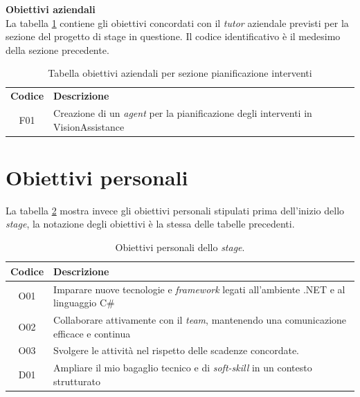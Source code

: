 \textbf{Obiettivi aziendali}\\
La tabella \ref{tab:obiettivi-aziendali-interventi} contiene gli obiettivi concordati con il \textit{tutor} aziendale previsti per la sezione del progetto di stage in questione.
Il codice identificativo è il medesimo della sezione precedente.
\begin{table}[H]
\centering
\begin{tabular}{|c|p{11cm}|}
\hline
\textbf{Codice} & \textbf{Descrizione} \\
F01 &  Creazione di un \textit{agent} per la pianificazione degli interventi in VisionAssistance \\
\hline
\end{tabular}
\caption{Tabella obiettivi aziendali per sezione pianificazione interventi}
\label{tab:obiettivi-aziendali-interventi}
\end{table}







\section{Obiettivi personali}
La tabella \ref{tab:obiettivi-personali} mostra invece gli obiettivi personali stipulati prima dell'inizio dello \textit{stage}, la notazione degli obiettivi è la stessa delle tabelle precedenti.

\begin{table}[H]
\centering
\begin{tabular}{|c|p{11cm}|}
\hline
\textbf{Codice} & \textbf{Descrizione} \\
\hline
O01 & Imparare nuove tecnologie e \textit{framework} legati all'ambiente .NET e al linguaggio C\# \\
\hline
O02 & Collaborare attivamente con il \textit{team}, mantenendo una comunicazione efficace e continua \\
\hline
O03 & Svolgere le attività nel rispetto delle scadenze concordate. \\
\hline
D01 & Ampliare il mio bagaglio tecnico e di \textit{soft-skill} in un contesto strutturato \\
\hline
\end{tabular}
\caption{Obiettivi personali dello \textit{stage}.}
\label{tab:obiettivi-personali}
\end{table}




\newpage